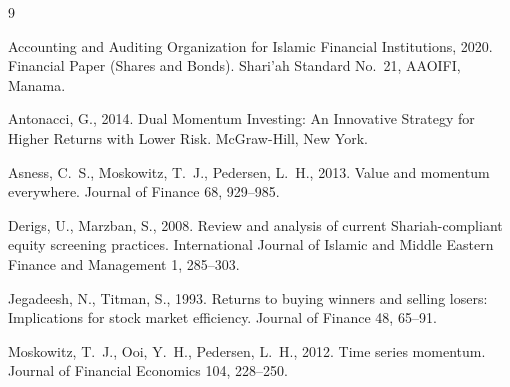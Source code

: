 \documentclass[11pt,letterpaper]{article}
\begin{document}

\begin{thebibliography}{9}

Accounting and Auditing Organization for Islamic Financial Institutions, 2020.
\newblock Financial Paper (Shares and Bonds).
\newblock Shari'ah Standard No.~21, AAOIFI, Manama.

Antonacci, G., 2014.
\newblock Dual Momentum Investing: An Innovative Strategy for Higher Returns with Lower Risk.
\newblock McGraw-Hill, New York.

Asness, C.~S., Moskowitz, T.~J., Pedersen, L.~H., 2013.
\newblock Value and momentum everywhere.
\newblock Journal of Finance 68, 929--985.

Derigs, U., Marzban, S., 2008.
\newblock Review and analysis of current Shariah-compliant equity screening practices.
\newblock International Journal of Islamic and Middle Eastern Finance and Management 1, 285--303.

Jegadeesh, N., Titman, S., 1993.
\newblock Returns to buying winners and selling losers: Implications for stock market efficiency.
\newblock Journal of Finance 48, 65--91.

Moskowitz, T.~J., Ooi, Y.~H., Pedersen, L.~H., 2012.
\newblock Time series momentum.
\newblock Journal of Financial Economics 104, 228--250.

\end{thebibliography}
\end{document}
